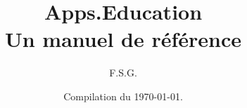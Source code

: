 \documentclass[a4paper, 12pt]{book}
\title{Apps.Education\\Un manuel de référence}
\author{F.S.G.}
\date{Compilation du \today{}.}
\renewcommand{\baselinestretch}{1.25}
\begin{document}
\begin{titlepage}
    \maketitle
\end{titlepage}


















%
%
%
\newpage
\renewcommand{\baselinestretch}{1}
\setlength{\parskip}{0em}
\tableofcontents
\listoffigures
\end{document}
